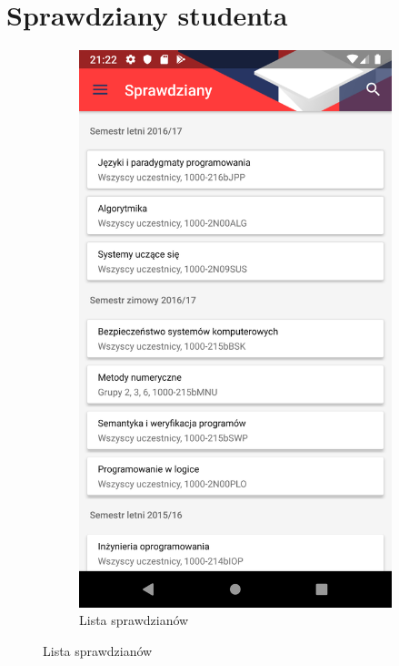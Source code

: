 \documentclass{pracamgr}
\begin{document}
\section{Sprawdziany studenta}

\begin{figure}[p]
	\centering
	\begin{subfigure}[t]{0.3\textwidth}
		\includegraphics[width=\textwidth]{img/tests_list.png}
		\caption{Lista sprawdzianów}
		\label{fig:tests_list}
	\end{subfigure}

\end{figure}
\end{document}
